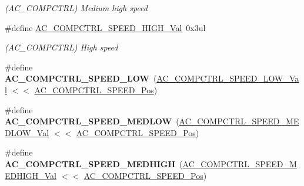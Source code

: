\begin{DoxyCompactItemize}
\begin{DoxyCompactList}\small\item\em (A\+C\+\_\+\+C\+O\+M\+P\+C\+T\+R\+L) Medium high speed \end{DoxyCompactList}\item 
\hypertarget{group___s_a_m_l21___a_c_ga6b45b0641286de29f24da3deb2330cc4}{}\#define \hyperlink{group___s_a_m_l21___a_c_ga6b45b0641286de29f24da3deb2330cc4}{A\+C\+\_\+\+C\+O\+M\+P\+C\+T\+R\+L\+\_\+\+S\+P\+E\+E\+D\+\_\+\+H\+I\+G\+H\+\_\+\+Val}~0x3ul\label{group___s_a_m_l21___a_c_ga6b45b0641286de29f24da3deb2330cc4}

\begin{DoxyCompactList}\small\item\em (A\+C\+\_\+\+C\+O\+M\+P\+C\+T\+R\+L) High speed \end{DoxyCompactList}\item 
\hypertarget{group___s_a_m_l21___a_c_gaf23c7bf00883163c837eb846cd84c04c}{}\#define {\bfseries A\+C\+\_\+\+C\+O\+M\+P\+C\+T\+R\+L\+\_\+\+S\+P\+E\+E\+D\+\_\+\+L\+O\+W}~(\hyperlink{group___s_a_m_l21___a_c_ga1a8973ca4af7dd2e1da973968af7e145}{A\+C\+\_\+\+C\+O\+M\+P\+C\+T\+R\+L\+\_\+\+S\+P\+E\+E\+D\+\_\+\+L\+O\+W\+\_\+\+Val}     $<$$<$ \hyperlink{group___s_a_m_l21___a_c_gaf0d15bf42764457190c7bf06e67c0d9c}{A\+C\+\_\+\+C\+O\+M\+P\+C\+T\+R\+L\+\_\+\+S\+P\+E\+E\+D\+\_\+\+Pos})\label{group___s_a_m_l21___a_c_gaf23c7bf00883163c837eb846cd84c04c}

\item 
\hypertarget{group___s_a_m_l21___a_c_ga90cf8aac977a5eb71cf913c49fe69965}{}\#define {\bfseries A\+C\+\_\+\+C\+O\+M\+P\+C\+T\+R\+L\+\_\+\+S\+P\+E\+E\+D\+\_\+\+M\+E\+D\+L\+O\+W}~(\hyperlink{group___s_a_m_l21___a_c_gab57cb133175ab6c58750e1b329629988}{A\+C\+\_\+\+C\+O\+M\+P\+C\+T\+R\+L\+\_\+\+S\+P\+E\+E\+D\+\_\+\+M\+E\+D\+L\+O\+W\+\_\+\+Val}  $<$$<$ \hyperlink{group___s_a_m_l21___a_c_gaf0d15bf42764457190c7bf06e67c0d9c}{A\+C\+\_\+\+C\+O\+M\+P\+C\+T\+R\+L\+\_\+\+S\+P\+E\+E\+D\+\_\+\+Pos})\label{group___s_a_m_l21___a_c_ga90cf8aac977a5eb71cf913c49fe69965}

\item 
\hypertarget{group___s_a_m_l21___a_c_ga6e68616fc0f6e9995eaf9be0e0cb4141}{}\#define {\bfseries A\+C\+\_\+\+C\+O\+M\+P\+C\+T\+R\+L\+\_\+\+S\+P\+E\+E\+D\+\_\+\+M\+E\+D\+H\+I\+G\+H}~(\hyperlink{group___s_a_m_l21___a_c_gaa385073c0d8d512d40202aa1b096da16}{A\+C\+\_\+\+C\+O\+M\+P\+C\+T\+R\+L\+\_\+\+S\+P\+E\+E\+D\+\_\+\+M\+E\+D\+H\+I\+G\+H\+\_\+\+Val} $<$$<$ \hyperlink{group___s_a_m_l21___a_c_gaf0d15bf42764457190c7bf06e67c0d9c}{A\+C\+\_\+\+C\+O\+M\+P\+C\+T\+R\+L\+\_\+\+S\+P\+E\+E\+D\+\_\+\+Pos})\label{group___s_a_m_l21___a_c_ga6e68616fc0f6e9995eaf9be0e0cb4141}


\end{DoxyCompactItemize}
